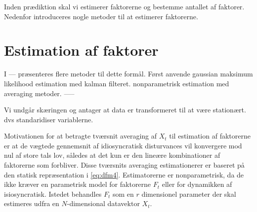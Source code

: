 Inden prædiktion skal vi estimerer faktorerne og bestemme antallet af faktorer.
Nedenfor introduceres nogle metoder til at estimerer faktorerne.

\section{Estimation af faktorer}
I --- præsenteres flere metoder til dette formål.
Først anvende gaussian maksimum likelihood estimation med kalman filteret.
nonparametrisk estimation med averaging metoder.
-----

Vi undgår skæringen og antager at data er transformeret til at være stationært.
dvs standaridiser variablerne.




Motivationen for at betragte tværsnit averaging af \(X_t\) til estimation af faktorerne er at de vægtede gennemsnit af idiosyncratisk disturvances vil konvergere mod nul af store tals lov, således at det kun er den lineære kombinationer af faktorerne som forbliver.
Disse tværsnits averaging estimationerer er baseret på den statisk repræsentation i \eqref{eq:dfm4}.
Estimatorerne er nonparametrisk, da de ikke kræver en parametrisk model for faktorerne \(F_t\) eller for dynamikken af isiosyncratisk.
Istedet behandles \(F_t\) som en \(r\) dimensionel parameter der skal estimeres udfra en \(N\)-dimensional datavektor \(X_t\).

